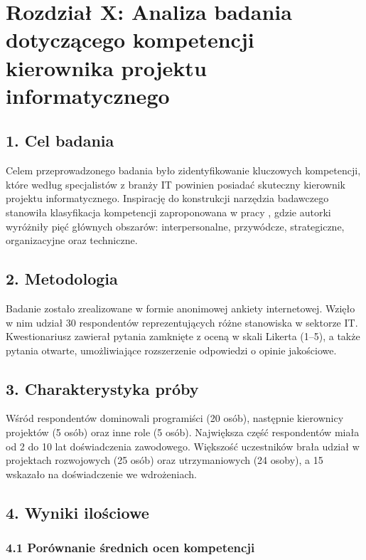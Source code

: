 \newpage

\section*{Rozdział X: Analiza badania dotyczącego kompetencji kierownika projektu informatycznego}

\subsection*{1. Cel badania}

Celem przeprowadzonego badania było zidentyfikowanie kluczowych kompetencji, które według specjalistów z branży IT powinien posiadać skuteczny kierownik projektu informatycznego. Inspirację do konstrukcji narzędzia badawczego stanowiła klasyfikacja kompetencji zaproponowana w pracy \textcite{araujo2020it}, gdzie autorki wyróżniły pięć głównych obszarów: interpersonalne, przywódcze, strategiczne, organizacyjne oraz techniczne.

\subsection*{2. Metodologia}

Badanie zostało zrealizowane w formie anonimowej ankiety internetowej. Wzięło w nim udział 30 respondentów reprezentujących różne stanowiska w sektorze IT. Kwestionariusz zawierał pytania zamknięte z oceną w skali Likerta (1–5), a także pytania otwarte, umożliwiające rozszerzenie odpowiedzi o opinie jakościowe.

\subsection*{3. Charakterystyka próby}

Wśród respondentów dominowali programiści (20 osób), następnie kierownicy projektów (5 osób) oraz inne role (5 osób). Największa część respondentów miała od 2 do 10 lat doświadczenia zawodowego. Większość uczestników brała udział w projektach rozwojowych (25 osób) oraz utrzymaniowych (24 osoby), a 15 wskazało na doświadczenie we wdrożeniach.

\subsection*{4. Wyniki ilościowe}

\subsubsection*{4.1 Porównanie średnich ocen kompetencji}

